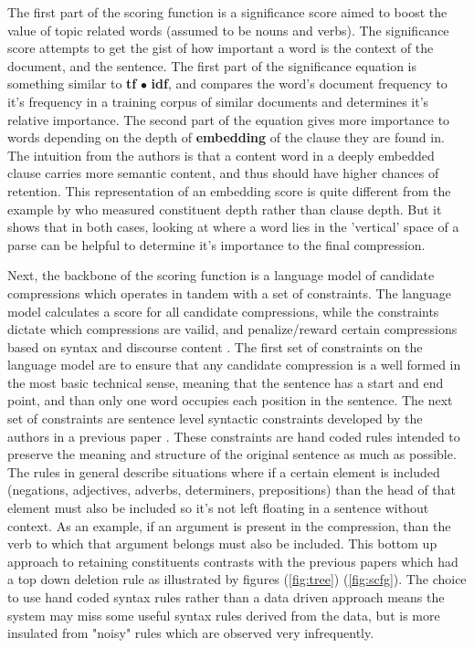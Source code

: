 {The first part of the scoring function is a significance score aimed to boost the value of topic related words (assumed to be nouns and verbs).  The significance score attempts to get the gist of how important a word is the context of the document, and the sentence.  The first part of the significance equation is something similar to  \textbf{tf} $ \bullet $ \textbf{idf}, and compares the word's document frequency to it's frequency in a training corpus of similar documents and determines it's relative importance.  The second part of the equation gives more importance to words depending on the depth of \textbf{embedding} of the clause they are found in.  The intuition from the authors is that a content word in a deeply embedded clause carries more semantic content, and thus should have higher chances of retention.  This representation of an embedding score is quite different from the example by \citet{galley2007lexicalized} who measured constituent depth rather than clause depth. But it shows that in both cases, looking at where a word lies in the 'vertical' space of a parse can be helpful to determine it's importance to the final compression.}

{Next, the backbone of the scoring function is a language model of candidate compressions which operates in tandem with a set of constraints.  The language model calculates a score for all  candidate compressions, while the constraints dictate which compressions are vailid, and penalize/reward certain compressions based on syntax and discourse content \citep{Clarke:2010:DCD:1950488.1950493}. The first set of constraints on the language model are to ensure that any candidate compression is a well formed in the most basic technical sense, meaning that the sentence has a start and end point, and than only one word occupies each position in the sentence.  The next set of constraints are sentence level syntactic constraints developed by the authors in a previous paper \citep{Clarke:2008:GIS:1622655.1622667}.  These constraints are hand coded rules intended to preserve the meaning and structure of the original sentence as much as possible.  The rules in general describe situations where if a certain element is included (negations, adjectives, adverbs, determiners, prepositions) than the head of that element must also be included so it's not left floating in a sentence without context. As an example, if an argument is present in the compression, than the verb to which that argument belongs must also be included.  This bottom up approach to retaining constituents contrasts with the previous papers which had a top down deletion rule as illustrated by figures (\ref{fig:tree}) (\ref{fig:scfg}). The choice to use hand coded syntax rules rather than a data driven approach means the system may miss some useful syntax rules derived from the data, but is more insulated from "noisy" rules which are observed very infrequently.}

